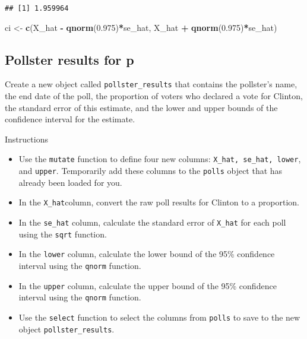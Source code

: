 \documentclass[]{article}
\newenvironment{Shaded}{\begin{snugshade}}{\end{snugshade}}
\newcommand{\KeywordTok}[1]{\textcolor[rgb]{0.13,0.29,0.53}{\textbf{#1}}}
\newcommand{\FloatTok}[1]{\textcolor[rgb]{0.00,0.00,0.81}{#1}}
\newcommand{\StringTok}[1]{\textcolor[rgb]{0.31,0.60,0.02}{#1}}
\newcommand{\OperatorTok}[1]{\textcolor[rgb]{0.81,0.36,0.00}{\textbf{#1}}}
\newcommand{\NormalTok}[1]{#1}
\providecommand{\tightlist}{%
  \setlength{\itemsep}{0pt}\setlength{\parskip}{0pt}}
\begin{document}
\begin{verbatim}
## [1] 1.959964
\end{verbatim}

\begin{Shaded}
\begin{Highlighting}[]
\NormalTok{ci <-}\StringTok{ }\KeywordTok{c}\NormalTok{(X_hat }\OperatorTok{-}\StringTok{ }\KeywordTok{qnorm}\NormalTok{(}\FloatTok{0.975}\NormalTok{)}\OperatorTok{*}\NormalTok{se_hat, X_hat }\OperatorTok{+}\StringTok{ }\KeywordTok{qnorm}\NormalTok{(}\FloatTok{0.975}\NormalTok{)}\OperatorTok{*}\NormalTok{se_hat)}
\end{Highlighting}
\end{Shaded}

\subsection{\texorpdfstring{\textbf{Pollster results for
p}}{Pollster results for p}}\label{pollster-results-for-p}

Create a new object called \texttt{pollster\_results} that contains the
pollster's name, the end date of the poll, the proportion of voters who
declared a vote for Clinton, the standard error of this estimate, and
the lower and upper bounds of the confidence interval for the estimate.

Instructions

\begin{itemize}
\tightlist
\item
  Use the \texttt{mutate} function to define four new columns:
  \texttt{X\_hat,\ se\_hat,\ lower}, and \texttt{upper}. Temporarily add
  these columns to the \texttt{polls} object that has already been
  loaded for you.
\item
  In the \texttt{X\_hat}column, convert the raw poll results for Clinton
  to a proportion.
\item
  In the \texttt{se\_hat} column, calculate the standard error of
  \texttt{X\_hat} for each poll using the \texttt{sqrt} function.
\item
  In the \texttt{lower} column, calculate the lower bound of the 95\%
  confidence interval using the \texttt{qnorm} function.
\item
  In the \texttt{upper} column, calculate the upper bound of the 95\%
  confidence interval using the \texttt{qnorm} function.
\item
  Use the \texttt{select} function to select the columns from
  \texttt{polls} to save to the new object \texttt{pollster\_results}.
\end{itemize}
\end{document}
